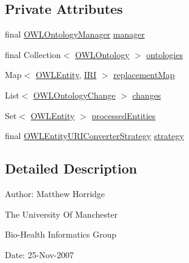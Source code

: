\subsection*{Private Attributes}
\begin{DoxyCompactItemize}
\item 
final \hyperlink{interfaceorg_1_1semanticweb_1_1owlapi_1_1model_1_1_o_w_l_ontology_manager}{O\-W\-L\-Ontology\-Manager} \hyperlink{classorg_1_1semanticweb_1_1owlapi_1_1util_1_1_o_w_l_entity_u_r_i_converter_aabf6f91659c11def9dad9c64dfe1795e}{manager}
\item 
final Collection$<$ \hyperlink{interfaceorg_1_1semanticweb_1_1owlapi_1_1model_1_1_o_w_l_ontology}{O\-W\-L\-Ontology} $>$ \hyperlink{classorg_1_1semanticweb_1_1owlapi_1_1util_1_1_o_w_l_entity_u_r_i_converter_a0094d34fbdc7761c4e281c3cd6d7b95c}{ontologies}
\item 
Map$<$ \hyperlink{interfaceorg_1_1semanticweb_1_1owlapi_1_1model_1_1_o_w_l_entity}{O\-W\-L\-Entity}, \hyperlink{classorg_1_1semanticweb_1_1owlapi_1_1model_1_1_i_r_i}{I\-R\-I} $>$ \hyperlink{classorg_1_1semanticweb_1_1owlapi_1_1util_1_1_o_w_l_entity_u_r_i_converter_a916b85c5e619e6ef45c6303959749681}{replacement\-Map}
\item 
List$<$ \hyperlink{classorg_1_1semanticweb_1_1owlapi_1_1model_1_1_o_w_l_ontology_change}{O\-W\-L\-Ontology\-Change} $>$ \hyperlink{classorg_1_1semanticweb_1_1owlapi_1_1util_1_1_o_w_l_entity_u_r_i_converter_a6bf90329d2dcbd24b95b13da78d13665}{changes}
\item 
Set$<$ \hyperlink{interfaceorg_1_1semanticweb_1_1owlapi_1_1model_1_1_o_w_l_entity}{O\-W\-L\-Entity} $>$ \hyperlink{classorg_1_1semanticweb_1_1owlapi_1_1util_1_1_o_w_l_entity_u_r_i_converter_a316ffd77f6f0de5b58adf2e070aa8546}{processed\-Entities}
\item 
final \hyperlink{interfaceorg_1_1semanticweb_1_1owlapi_1_1util_1_1_o_w_l_entity_u_r_i_converter_strategy}{O\-W\-L\-Entity\-U\-R\-I\-Converter\-Strategy} \hyperlink{classorg_1_1semanticweb_1_1owlapi_1_1util_1_1_o_w_l_entity_u_r_i_converter_a1d9858051f6393dcac39a57d1e91e685}{strategy}
\end{DoxyCompactItemize}


\subsection{Detailed Description}
Author\-: Matthew Horridge\par
 The University Of Manchester\par
 Bio-\/\-Health Informatics Group\par
 Date\-: 25-\/\-Nov-\/2007\par
\par
 

